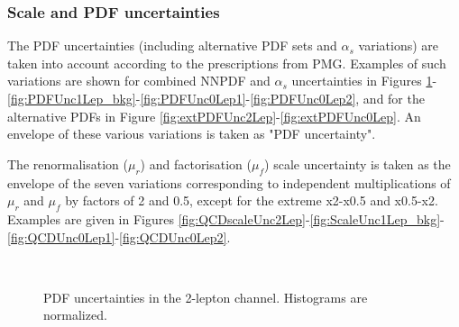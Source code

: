 
\clearpage
\subsubsection{Scale and PDF uncertainties}
\label{subsec:scale_pdf_unc}

The PDF uncertainties (including alternative PDF sets and $\alpha_s$ variations) are taken into account
according to the prescriptions from PMG. 
Examples of such variations are shown
for combined NNPDF and $\alpha_s$ uncertainties 
in Figures \ref{fig:intPDFUnc2Lep}-\ref{fig:PDFUnc1Lep_bkg}-\ref{fig:PDFUnc0Lep1}-\ref{fig:PDFUnc0Lep2},
and for the alternative PDFs
in Figure \ref{fig:extPDFUnc2Lep}-\ref{fig:extPDFUnc0Lep}.
An envelope of these various variations is taken as "PDF uncertainty".


The renormalisation ($\mu_r$) and factorisation ($\mu_f$) scale uncertainty 
is taken as the envelope of the seven variations corresponding to independent multiplications 
of $\mu_r$ and $\mu_f$ by factors of 2 and 0.5, 
except for the extreme x2-x0.5 and x0.5-x2. 
Examples are given in Figures \ref{fig:QCDscaleUnc2Lep}-\ref{fig:ScaleUnc1Lep_bkg}-\ref{fig:QCDUnc0Lep1}-\ref{fig:QCDUnc0Lep2}.


\begin{figure}[ht]
    \centering
    	\\
        \caption{PDF uncertainties in the 2-lepton channel. Histograms are normalized.} 
    \label{fig:intPDFUnc2Lep}
\end{figure}

